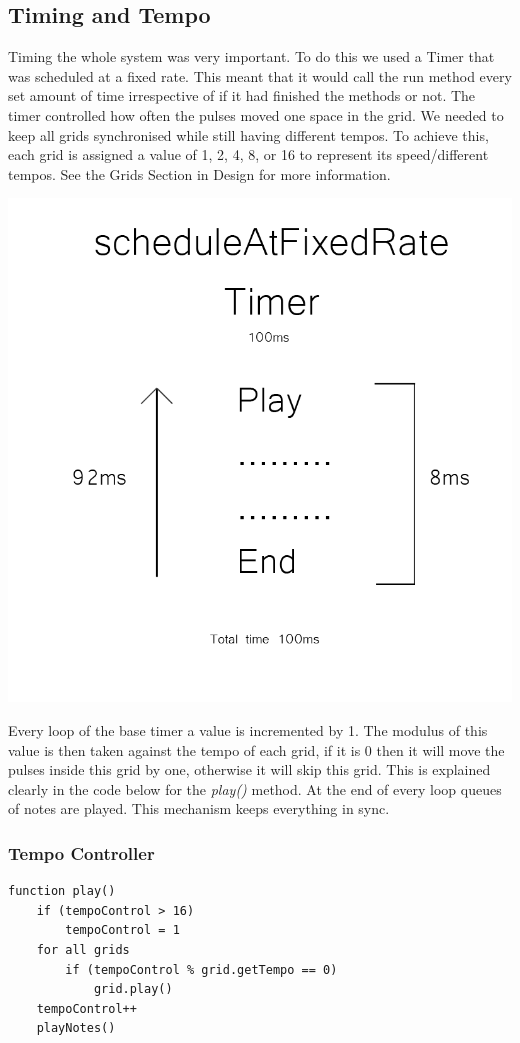 \documentclass[10pt,a4paper]{article}
\begin{document}
\pagebreak
\subsection{Timing and Tempo}
Timing the whole system was very important. To do this we used a Timer that was scheduled at a fixed rate. This meant that it would call the run method every set amount of time irrespective of if it had finished the methods or not. The timer controlled how often the pulses moved one space in the grid. We needed to keep all grids synchronised while still having different tempos. To achieve this, each grid is assigned a value of 1, 2, 4, 8, or 16 to represent its speed/different tempos. See the Grids Section in Design for more information.\\
\begin{center}
\includegraphics[scale=0.15]{utimer.png}
\end{center}
Every loop of the base timer a value is incremented by 1. The modulus of this value is then taken against the tempo of each grid, if it is 0 then it will move the pulses inside this grid by one, otherwise it will skip this grid. This is explained clearly in the code below for the \textit{play()} method. At the end of every loop queues of notes are played. This mechanism keeps everything in sync.\\
\subsubsection{Tempo Controller}
\begin{center}
\begin{verbatim}
function play() 
    if (tempoControl > 16) 
        tempoControl = 1 
    for all grids 
        if (tempoControl % grid.getTempo == 0) 
            grid.play() 
    tempoControl++
    playNotes() 
	
\end{verbatim}
\end{center}
\end{document}
